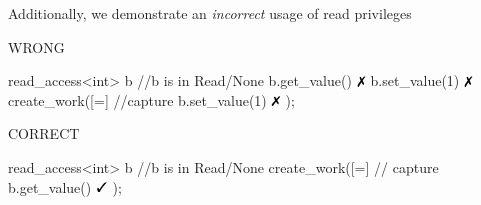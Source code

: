 Additionally, we demonstrate an \emph{incorrect} usage of read privileges

\begin{minipage}[t]{0.45\linewidth}
\centering
\centering WRONG
\begin{vaspPseudo}
read_access<int> b
//b is in Read/None
b.get_value()   $\no$
b.set_value(1)  $\no$
create_work([=]{ //capture
  b.set_value(1) $\no$
});
\end{vaspPseudo}
\end{minipage}
\begin{minipage}[t]{0.45\linewidth}
\centering
\centering CORRECT
\begin{vaspPseudo}
read_access<int> b
//b is in Read/None
create_work([=]{ // capture
  b.get_value()  $\yes$
});
\end{vaspPseudo}
\end{minipage}



